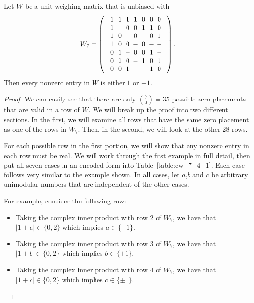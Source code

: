 \begin{lemma} \label{lem-proof:cw_7_4}
 Let $W$ be a unit weighing matrix that is unbiased with
$$W_7=\left(\begin{array}{c}
\Zp\Zp\Zp\Zp\Zz\Zz\Zz\\
\Zp\Zm\Zz\Zz\Zp\Zp\Zz\\
\Zp\Zz\Zm\Zz\Zm\Zz\Zp\\
\Zp\Zz\Zz\Zm\Zz\Zm\Zm\\
\Zz\Zp\Zm\Zz\Zz\Zp\Zm\\
\Zz\Zp\Zz\Zm\Zp\Zz\Zp\\
\Zz\Zz\Zp\Zm\Zm\Zp\Zz
\end{array}\right).$$
Then every nonzero entry in $W$ is either $1$ or $-1$.

 \begin{proof}
  We can easily see that there are only $\binom73=35$ possible zero placements that are valid in a row of $W$. We will break up the proof into two different sections. In the first, we will examine all rows that have the same zero placement as one of the rows in $W_7$. Then, in the second, we will look at the other 28 rows.

  For each possible row in the first portion, we will show that any nonzero entry in each row must be real. We will work through the first example in full detail, then put all seven cases in an encoded form into Table~\ref{table:cw_7_4_1}. Each case follows very similar to the example shown. In all cases, let $a$,$b$ and $c$ be arbitrary unimodular numbers that are independent of the other cases.

  For example, consider the following row:  
     \begin{itemize}
      \item Taking the complex inner product with row 2 of $W_7$, we have that $|1+a| \in \{0,2\}$ which implies $a \in \{\pm1\}$.
      \item Taking the complex inner product with row 3 of $W_7$, we have that $|1+b| \in \{0,2\}$ which implies $b \in \{\pm1\}$.
      \item Taking the complex inner product with row 4 of $W_7$, we have that $|1+c| \in \{0,2\}$ which implies $c \in \{\pm1\}$.
     \end{itemize}



\end{proof}
\end{lemma}
